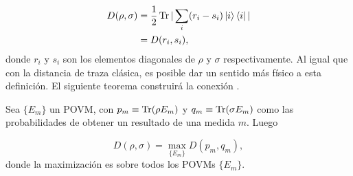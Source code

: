 \begin{align*}
D(\rho,\sigma) &= \frac{1}{2} \Tr |\sum_{i} (r_{i}-s_{i})\ket{i}\bra{i}|\\
\quad &= D(r_{i},s_{i}),
\end{align*}
donde $r_{i}$ y $s_{i}$ son los elementos diagonales de $\rho$ y $\sigma$ respectivamente. Al igual que con la distancia de traza clásica, es posible dar un sentido más físico a esta definición. El siguiente teorema construirá la conexión \cite{NielsenInformation}.
\begin{theorem}
Sea $\{ E_{m}\}$ un POVM, con  $p_{m} \equiv \Tr(\rho E_{m})$  y  $q_{m}\equiv \Tr(\sigma E_{m})$ como las probabilidades de obtener un resultado de una medida $m$. Luego

\begin{equation}
D(\rho,\sigma)= \max_{ \{ E_{m}\} } D(p_{m},q_{m}),
\end{equation}
donde la maximización es sobre todos los POVMs $\{ E_{m}\}$.
\end{theorem}

